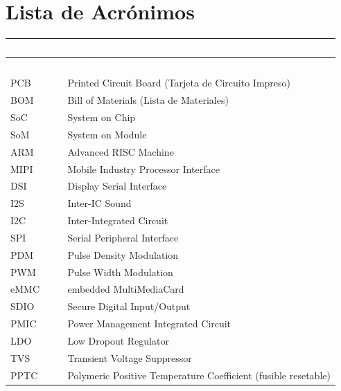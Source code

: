 \chapter*{Lista de Acrónimos}

\begin{longtable}{L{2.5cm} L{12cm}}
  \toprule
  \textcolor{white}{\textbf{Acrónimo}} &
  \textcolor{white}{\textbf{Significado}} \\
  \midrule
  \endfirsthead
  \textcolor{white}{\textbf{Acrónimo}} &
  \textcolor{white}{\textbf{Significado}} \\
  \midrule
  \endhead
  \bottomrule
  \endfoot
  PCB    & Printed Circuit Board (Tarjeta de Circuito Impreso) \\
  BOM    & Bill of Materials (Lista de Materiales) \\
  SoC    & System on Chip \\
  SoM    & System on Module \\
  ARM    & Advanced RISC Machine \\
  MIPI   & Mobile Industry Processor Interface \\
  DSI    & Display Serial Interface \\
  I2S    & Inter-IC Sound \\
  I2C    & Inter-Integrated Circuit \\
  SPI    & Serial Peripheral Interface \\
  PDM    & Pulse Density Modulation \\
  PWM    & Pulse Width Modulation \\
  eMMC   & embedded MultiMediaCard \\
  SDIO   & Secure Digital Input/Output \\
  PMIC   & Power Management Integrated Circuit \\
  LDO    & Low Dropout Regulator \\
  TVS    & Transient Voltage Suppressor \\
  PPTC   & Polymeric Positive Temperature Coefficient (fusible resetable) \\

\end{longtable}
